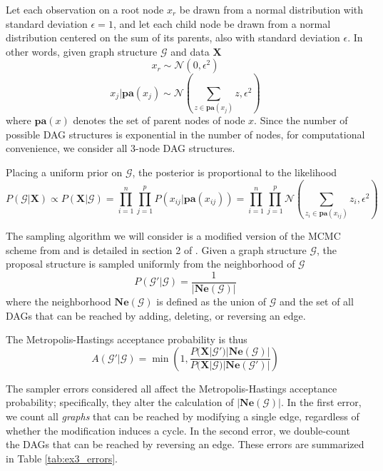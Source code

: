 \documentclass[a4paper,11pt]{article}
\begin{document}
Let each observation on a root node $x_{r}$ be drawn from a normal distribution with standard deviation $\epsilon=1$, and let each child node be drawn from a normal distribution centered on the sum of its parents, also with standard deviation $\epsilon$. In other words, given graph structure $\mathcal{G}$ and data $\mathbf{X}$
\begin{equation}
    x_{r} \sim \mathcal{N}(0, \epsilon^2)
\end{equation}
\begin{equation}
    x_{j}|\mathbf{pa}(x_{j}) \sim \mathcal{N}(\sum_{z \in \mathbf{pa}(x_{j})} z, \epsilon^2)
\end{equation}
where $\mathbf{pa}(x)$ denotes the set of parent nodes of node $x$. Since the number of possible DAG structures is exponential in the number of nodes, for computational convenience, we consider all 3-node DAG structures.

Placing a uniform prior on $\mathcal{G}$, the posterior is proportional to the likelihood
\begin{equation}
    P(\mathcal{G}|\mathbf{X}) \propto P(\mathbf{X}|\mathcal{G}) = \prod_{i=1}^{n} \prod_{j=1}^{p} P(x_{ij}|\mathbf{pa}(x_{ij})) = \prod_{i=1}^{n} \prod_{j=1}^{p}
    \mathcal{N}(\sum_{z_{i} \in \mathbf{pa}(x_{ij})} z_{i}, \epsilon^2)
\end{equation}

The sampling algorithm we will consider is a modified version of the MCMC scheme from \cite{madigan_bayesian_1995} and is detailed in section 2 of \cite{grzegorczyk_improving_2008}. Given a graph structure $\mathcal{G}$, the proposal structure is sampled uniformly from the neighborhood of $\mathcal{G}$
\begin{equation}
P(\mathcal{G}' | \mathcal{G}) = \frac{1}{|\mathbf{Ne}(\mathcal{G})|}
\end{equation}
where the neighborhood $\mathbf{Ne}(\mathcal{G})$ is defined as the union of $\mathcal{G}$ and the set of all DAGs that can be reached by adding, deleting, or reversing an edge.

The Metropolis-Hastings acceptance probability is thus
\begin{equation}
A(\mathcal{G}'|\mathcal{G}) = \min{\left(1,\frac{P(\mathbf{X}|\mathcal{G}')|\mathbf{Ne}(\mathcal{G})|}{P(\mathbf{X}|\mathcal{G})|\mathbf{Ne}(\mathcal{G}')|}\right)}
\end{equation}

The sampler errors considered all affect the Metropolis-Hastings acceptance probability; specifically, they alter the calculation of $|\mathbf{Ne}(\mathcal{G})|$. In the first error, we count all \textit{graphs} that can be reached by modifying a single edge, regardless of whether the modification induces a cycle. In the second error, we double-count the DAGs that can be reached by reversing an edge. These errors are summarized in Table \ref{tab:ex3_errors}.
\end{document}
